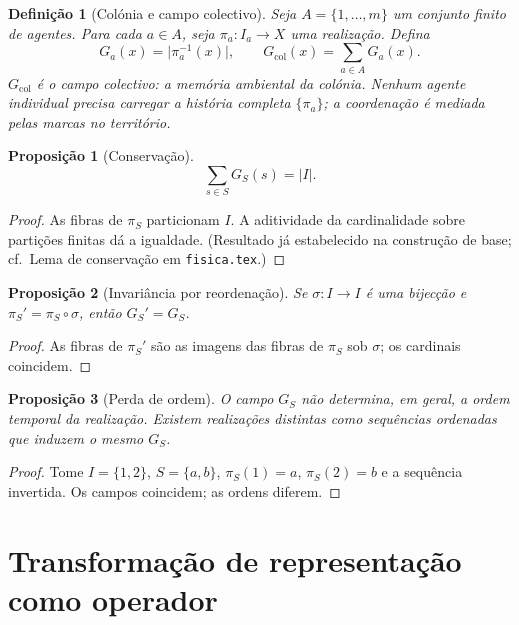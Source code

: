 \documentclass[11pt,a4paper]{article}
\newtheorem{definicao}{Definição}
\newtheorem{proposicao}{Proposição}
\begin{document}
\begin{definicao}[Colónia e campo colectivo]
\label{def:colonia}
Seja \(A=\{1,\dots,m\}\) um conjunto finito de agentes. Para cada \(a\in A\), seja \(\pi_a\colon I_a\to X\) uma realização. Defina
\[
G_a(x)=\lvert\pi_a^{-1}(x)\rvert,\qquad
G_{\mathrm{col}}(x)=\sum_{a\in A}G_a(x).
\]
\(G_{\mathrm{col}}\) é o campo colectivo: a memória ambiental da colónia. Nenhum agente individual precisa carregar a história completa \(\{\pi_a\}\); a coordenação é mediada pelas marcas no território.
\end{definicao}

\begin{proposicao}[Conservação]
\label{prop:conservacao}
\[
\sum_{s\in S}G_S(s)=\lvert I\rvert.
\]
\end{proposicao}

\begin{proof}
As fibras de \(\pi_S\) particionam \(I\). A aditividade da cardinalidade sobre partições finitas dá a igualdade. (Resultado já estabelecido na construção de base; cf.\ Lema de conservação em \texttt{fisica.tex}.)
\end{proof}

\begin{proposicao}[Invariância por reordenação]
\label{prop:reordenacao}
Se \(\sigma\colon I\to I\) é uma bijecção e \(\pi_S'=\pi_S\circ\sigma\), então \(G_S'=G_S\).
\end{proposicao}

\begin{proof}
As fibras de \(\pi_S'\) são as imagens das fibras de \(\pi_S\) sob \(\sigma\); os cardinais coincidem.
\end{proof}

\begin{proposicao}[Perda de ordem]
\label{prop:perda-ordem}
O campo \(G_S\) não determina, em geral, a ordem temporal da realização. Existem realizações distintas como sequências ordenadas que induzem o mesmo \(G_S\).
\end{proposicao}

\begin{proof}
Tome \(I=\{1,2\}\), \(S=\{a,b\}\), \(\pi_S(1)=a\), \(\pi_S(2)=b\) e a sequência invertida. Os campos coincidem; as ordens diferem.
\end{proof}

\section{Transformação de representação como operador}
\end{document}
